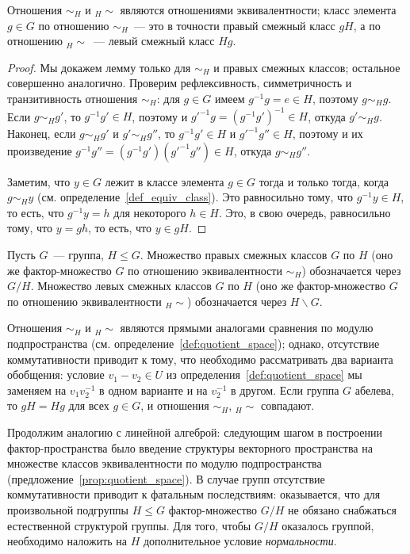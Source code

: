 \begin{lemma}
Отношения $\sim_H$ и ${}_H{\sim}$ являются отношениями эквивалентности;
класс элемента $g\in G$ по отношению $\sim_H$~--- это в точности
правый смежный класс $gH$, а по отношению ${}_H{\sim}$~--- левый смежный
класс $Hg$.
\end{lemma}
\begin{proof}
Мы докажем лемму только для $\sim_H$ и правых смежных классов;
остальное совершенно аналогично.
Проверим рефлексивность, симметричность и транзитивность отношения
$\sim_H$: для $g\in G$ имеем $g^{-1}g=e\in H$, поэтому $g\sim_Hg$.
Если $g\sim_H g'$, то $g^{-1}g'\in H$, поэтому и $g'^{-1}g =
(g^{-1}g')^{-1}\in H$, откуда $g'\sim_H g$. Наконец, если $g\sim_H g'$
и $g'\sim_H g''$, то $g^{-1}g'\in H$ и $g'^{-1}g''\in H$, поэтому и их
произведение $g^{-1}g''=(g^{-1}g')(g'^{-1}g'')\in H$, откуда
$g\sim_Hg''$.

Заметим, что $y\in G$ лежит в классе элемента $g\in G$
тогда и только тогда, когда $g\sim_H y$
(см. определение~\ref{def_equiv_class}). Это равносильно тому, что
$g^{-1}y\in H$, то есть, что $g^{-1}y = h$ для некоторого $h\in
H$. Это, в свою очередь, равносильно тому, что $y=gh$, то есть, что
$y\in gH$.
\end{proof}

\begin{definition}
Пусть $G$~--- группа, $H\leq G$.
Множество правых смежных классов $G$ по $H$ (оно же фактор-множество
$G$ по отношению эквивалентности $\sim_H$) обозначается через
$G/H$. Множество левых смежных классов $G$ по $H$ (оно же
фактор-множество $G$ по отношению эквивалентности ${}_H{\sim}$)
обозначается через $H\backslash G$.
\end{definition}

\begin{remark}\label{rem:coset_analogy}
Отношения $\sim_H$ и ${}_H{\sim}$ являются прямыми аналогами сравнения
по модулю подпространства (см. определение~\ref{def:quotient_space});
однако, отсутствие коммутативности приводит к тому, что необходимо
рассматривать два варианта обобщения: условие $v_1-v_2\in U$ из
определения~\ref{def:quotient_space} мы заменяем на $v_1v_2^{-1}$ в
одном варианте и на $v_2^{-1}$ в другом. Если группа $G$ абелева, то
$gH = Hg$ для всех $g\in G$, и отношения $\sim_H$, ${}_H{\sim}$
совпадают.
\end{remark}

Продолжим аналогию с линейной алгеброй: следующим шагом в построении
фактор-пространства было введение структуры векторного пространства на
множестве классов эквивалентности по модулю подпространства
(предложение~\ref{prop:quotient_space}).
В случае групп отсутствие коммутативности приводит к фатальным
последствиям: оказывается, что для произвольной подгруппы $H\leq G$
фактор-множество $G/H$ не обязано снабжаться естественной структурой
группы. Для того, чтобы $G/H$ оказалось группой, необходимо наложить
на $H$ дополнительное условие {\it нормальности}.

